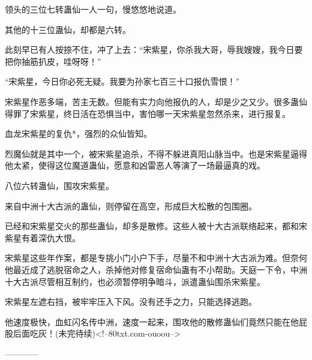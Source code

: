 \begin{this_body}
领头的三位七转蛊仙一人一句，慢悠悠地说道。

其他的十三位蛊仙，却都是六转。

此刻早已有人按捺不住，冲了上去：“宋紫星，你杀我大哥，辱我嫂嫂，我今日要把你抽筋扒皮，哇呀呀！”

“宋紫星，今日你必死无疑。我要为孙家七百三十口报仇雪恨！”

宋紫星作恶多端，苦主无数。但能有实力向他报仇的人，却是少之又少。很多蛊仙得罪了宋紫星，终日活在恐惧当中，害怕哪一天宋紫星忽然杀来，进行报复。

血龙宋紫星的复仇*，强烈的众仙皆知。

烈魔仙就是其中一个，被宋紫星追杀，不得不躲进真阳山脉当中。也是宋紫星逼得他太紧，使得这位魔道蛊仙，愿意和凶雷恶人等演了一场最逼真的戏。

八位六转蛊仙，围攻宋紫星。

来自中洲十大古派的蛊仙，则停留在高空，形成巨大松散的包围圈。

已经和宋紫星交火的那些蛊仙，却多是散修。这些人被十大古派联络起来，都和宋紫星有着深仇大恨。

宋紫星这些年作案，都是专挑小门小户下手，尽量不和中洲十大古派为难。但奈何他最近成了逃脱宿命之人，杀掉他对修复宿命仙蛊有不小帮助。天庭一下令，中洲十大古派尽管相互制约，也必须暂停明争暗斗，派遣蛊仙围杀宋紫星。

宋紫星左遮右挡，被牢牢压入下风。没有还手之力，只能选择逃跑。

他速度极快，血虹闪名传中洲，速度一起来，围攻他的散修蛊仙们竟然只能在他屁股后面吃灰！(未完待续)<!--80txt.com-ouoou-->

------------

\end{this_body}


